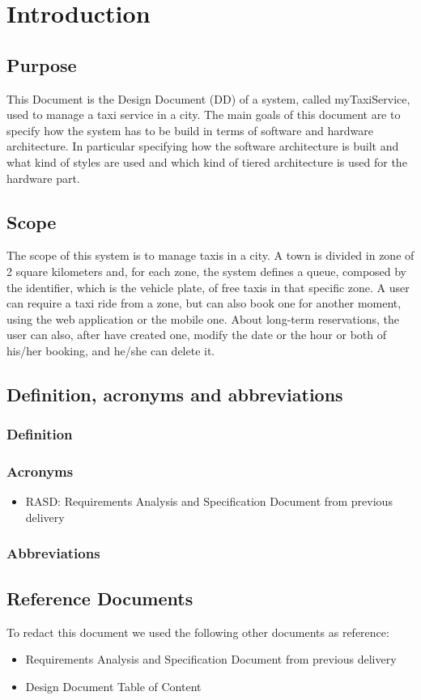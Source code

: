 \section{Introduction}
\subsection{Purpose}
	This Document is the Design Document (DD) of a system, called myTaxiService, used to manage  a taxi service in a city. The main goals of this document are to specify how the system has to be build in terms of software and hardware architecture. In particular specifying how the software architecture is built and what kind of styles are used and which kind of tiered architecture is used for the hardware part.
\subsection{Scope}
	The scope of this system is to manage taxis in a city. A town is divided in zone of 2 square kilometers and, for each zone, the system defines a queue, composed by the identifier, which is the vehicle plate, of free taxis in that specific zone. A user can require a taxi ride from a zone, but can also book one for another moment, using the web application or the mobile one. About long-term reservations, the user can also, after have created one, modify the date or the hour or both of his/her booking, and he/she can delete it. 
\subsection{Definition, acronyms and abbreviations}
	\subsubsection{Definition}
	\subsubsection{Acronyms}
		 \begin{itemize}
		 	\item RASD: Requirements Analysis and Specification Document from previous delivery
		 \end{itemize}
	\subsubsection{Abbreviations}
\subsection{Reference Documents}
	To redact this document we used the following other documents as reference:
	\begin{itemize}
		\item Requirements Analysis and Specification Document from previous delivery
		\item Design Document Table of Content 
	\end{itemize}
